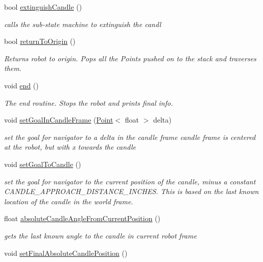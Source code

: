 \begin{DoxyCompactItemize}
bool \hyperlink{classRobot_a0dfb8f97d6a9448bc6f9ccc5b9efb9fb}{extinguish\-Candle} ()
\begin{DoxyCompactList}\small\item\em calls the sub-\/state machine to extinguish the candl \end{DoxyCompactList}\item 
bool \hyperlink{classRobot_ac1faa7fbfb483c4053dc35f368359c0b}{return\-To\-Origin} ()
\begin{DoxyCompactList}\small\item\em Returns robot to origin. Pops all the Points pushed on to the stack and traverses them. \end{DoxyCompactList}\item 
void \hyperlink{classRobot_a9dab3fb1d3619cbc9b8b1e19f6320c6f}{end} ()
\begin{DoxyCompactList}\small\item\em The end routine. Stops the robot and prints final info. \end{DoxyCompactList}\item 
void \hyperlink{classRobot_a890d4f4ee0eed7fe96f551b52f0d7407}{set\-Goal\-In\-Candle\-Frame} (\hyperlink{classPoint}{Point}$<$ float $>$ delta)
\begin{DoxyCompactList}\small\item\em set the goal for navigator to a delta in the candle frame candle frame is centered at the robot, but with x towards the candle \end{DoxyCompactList}\item 
void \hyperlink{classRobot_a6d144ed908ee859cfadda61e2adcb393}{set\-Goal\-To\-Candle} ()
\begin{DoxyCompactList}\small\item\em set the goal for navigator to the current position of the candle, minus a constant C\-A\-N\-D\-L\-E\-\_\-\-A\-P\-P\-R\-O\-A\-C\-H\-\_\-\-D\-I\-S\-T\-A\-N\-C\-E\-\_\-\-I\-N\-C\-H\-E\-S. This is based on the last known location of the candle in the world frame. \end{DoxyCompactList}\item 
float \hyperlink{classRobot_a100ecac9c55a7c1552bf933e1a2dd9d1}{absolute\-Candle\-Angle\-From\-Current\-Position} ()
\begin{DoxyCompactList}\small\item\em gets the last known angle to the candle in current robot frame \end{DoxyCompactList}\item 
void \hyperlink{classRobot_a0041769ee864f2952fab05db433e20ea}{set\-Final\-Absolute\-Candle\-Position} ()

\end{DoxyCompactItemize}
